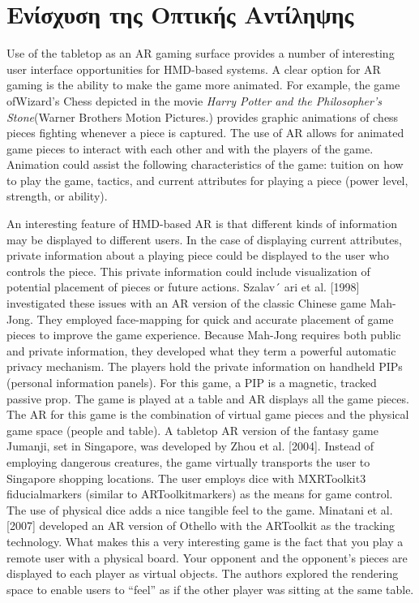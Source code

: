 \section{Ενίσχυση της Οπτικής Αντίληψης}

Use of the tabletop as an AR gaming surface provides a number of interesting user interface opportunities for HMD-based systems. A clear option for AR gaming is the ability to make the game more animated. For example, the game ofWizard’s Chess depicted in the movie \textit{Harry Potter and the Philosopher’s Stone}(Warner Brothers Motion Pictures.) provides graphic animations of chess pieces fighting whenever a piece is captured. The use of AR allows for animated game pieces to interact with each other and with the players of the game. Animation could assist the following characteristics of the game: tuition on how to play the game, tactics, and current attributes for playing a piece (power level, strength, or ability).

An interesting feature of HMD-based AR is that different kinds of information may be displayed to different users. In the case of displaying current attributes, private information about a playing piece could be displayed to the user who controls the piece. This private information could include visualization of potential placement of pieces or future actions. Szalav´ ari et al. [1998] investigated these issues with an AR version of the classic Chinese game Mah-Jong. They employed face-mapping for quick and accurate placement of game pieces to improve the game experience. Because Mah-Jong requires both public and private information, they developed what they term a powerful automatic privacy mechanism. The players hold the private information on handheld PIPs (personal information panels). For this game, a PIP is a magnetic, tracked passive prop. The game is played at a table and AR displays all the game pieces. The AR for this game is the combination of virtual game pieces and the physical game space (people and table).
A tabletop AR version of the fantasy game Jumanji, set in Singapore, was developed by Zhou et al. [2004]. Instead of employing dangerous creatures, the game virtually transports the user to Singapore shopping locations. The user employs dice with MXRToolkit3 fiducialmarkers (similar to ARToolkitmarkers) as the means for game control. The use of physical dice adds a nice tangible feel to the game. Minatani et al. [2007] developed an AR version of Othello with the ARToolkit as the tracking technology. What makes this a very interesting game is the fact that you play a remote user with a physical board. Your opponent and the opponent’s pieces are displayed to each player as virtual objects. The authors explored the rendering space to enable users to “feel” as if the other player was sitting at the same table.


